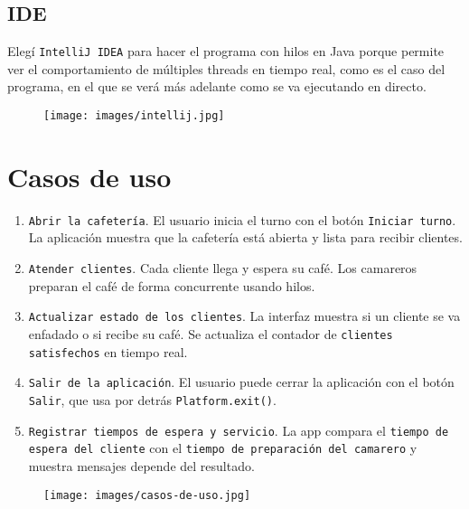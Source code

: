 \documentclass[14pt]{extarticle}
\begin{document}
    \subsection{IDE}
        Elegí \texttt{IntelliJ IDEA} para hacer el programa con hilos en Java porque permite ver el comportamiento de múltiples threads en tiempo real, como es el caso del programa, en el que se verá más adelante como se va ejecutando en directo.
        \begin{figure}[h!]
            \centering
            \texttt{[image: images/intellij.jpg]}
        \end{figure}



    \newpage    
    \section{Casos de uso}

        \begin{enumerate}
            \item \texttt{Abrir la cafetería}.  
            El usuario inicia el turno con el botón \texttt{Iniciar turno}. La aplicación muestra que la cafetería está abierta y lista para recibir clientes.
            
            \item \texttt{Atender clientes}.  
            Cada cliente llega y espera su café. Los camareros preparan el café de forma concurrente usando hilos.
            
            \item \texttt{Actualizar estado de los clientes}.  
            La interfaz muestra si un cliente se va enfadado o si recibe su café. Se actualiza el contador de \texttt{clientes satisfechos} en tiempo real.
            
            \item \texttt{Salir de la aplicación}.  
            El usuario puede cerrar la aplicación con el botón \texttt{Salir}, que usa por detrás \texttt{Platform.exit()}.
            
            \item \texttt{Registrar tiempos de espera y servicio}.  
            La app compara el \texttt{tiempo de espera del cliente} con el \texttt{tiempo de preparación del camarero} y muestra mensajes depende del resultado.
        \end{enumerate}

        \begin{figure}[h!]
            \centering
            \texttt{[image: images/casos-de-uso.jpg]}
        \end{figure}
\end{document}
